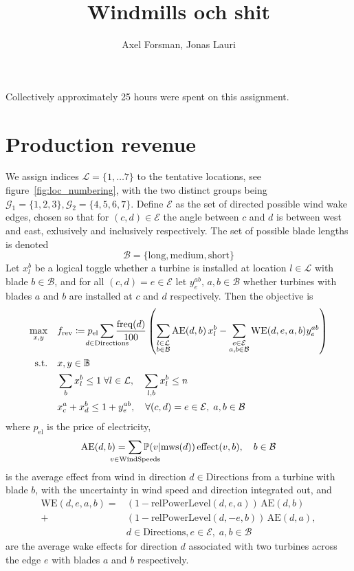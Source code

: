 \documentclass{article}
\title{Windmills och shit}
\author{Axel Forsman, Jonas Lauri}
\begin{document}
\maketitle
Collectively approximately 25 hours were spent on this assignment.

\section{Production revenue}\label{sec:prod_revenue}

We assign indices $\mathcal L = \{1, \ldots 7\}$ to the tentative locations,
see figure~\ref{fig:loc_numbering}, with the two distinct groups being
$ \mathcal G_1 = \{1, 2, 3\}, \mathcal G_2 = \{4, 5, 6, 7\}$.
Define $\mathcal E$ as the set of directed possible wind wake edges,
chosen so that for $(c, d) \in \mathcal E$ the angle between $c$ and $d$
is between west and east, exlusively and inclusively respectively.
The set of possible blade lengths is denoted
$$ \mathcal B = \{\text{long}, \text{medium}, \text{short}\} $$
Let $x_l^b$ be a logical toggle whether
a turbine is installed at location $l \in \mathcal L$
with blade $b \in \mathcal B$,
and for all $(c, d) = e \in \mathcal E$ let $y_e^{ab}, \, a, b \in \mathcal B$
whether turbines with blades $a$ and $b$ are installed at $c$ and $d$ respectively.
Then the objective is
\begin{equation*}
	\begin{aligned}
		\max_{x, y} \quad & f_\text{rev} \coloneqq p_\text{el}\sum_{\mathclap{d \in \text{Directions}}} \frac{\text{freq}(d)}{100} \left( \sum_{\substack{l \in \mathcal L \\ b \in \mathcal B}} \text{AE}(d, b) \, x_l^b - \sum_{\substack{e \in \mathcal E \\ a,b \in \mathcal B}} \text{WE}(d, e, a, b) y_e^{ab} \right) \\
        \text{s.t.} \quad & x, y \in \mathbb B \\
		& \sum_b x_l^b \le 1 \; \forall l \in \mathcal L, \quad \sum_{l, b} x_l^b \le n \\
& x_c^a + x_d^b \le 1 + y_e^{ab}, \quad \forall (c, d) = e \in \mathcal E, \; a, b \in \mathcal B
    \end{aligned}
\end{equation*}
where $p_\text{el}$ is the price of electricity,
$$ \text{AE}(d, b) = \sum_{\mathclap{v \in \text{WindSpeeds}}} \mathbb P(v \vert \text{mws}(d)) \, \text{effect}(v, b), \quad b \in \mathcal B $$
is the average effect from wind in direction $d \in \text{Directions}$
from a turbine with blade $b$,
with the uncertainty in wind speed and direction integrated out, and
\begin{align*}
	\text{WE}(d, e, a, b) = &(1 - \text{relPowerLevel}(d, e, a)) \, \text{AE}(d, b) \\
	+ &(1 - \text{relPowerLevel}(d, -e, b)) \, \text{AE}(d, a), \\
	& d \in \text{Directions}, e \in \mathcal E, \; a,b \in \mathcal B
\end{align*}
are the average wake effects for direction $d$ associated with
two turbines across the edge $e$ with blades $a$ and $b$ respectively.
\end{document}
